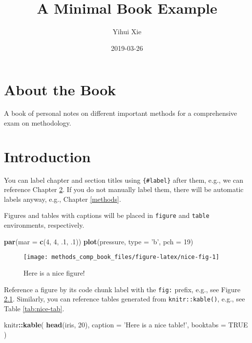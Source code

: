 \documentclass[]{book}
\title{A Minimal Book Example}
\author{Yihui Xie}
\date{2019-03-26}
\newenvironment{Shaded}{\begin{snugshade}}{\end{snugshade}}
\newcommand{\KeywordTok}[1]{\textcolor[rgb]{0.13,0.29,0.53}{\textbf{#1}}}
\newcommand{\DataTypeTok}[1]{\textcolor[rgb]{0.13,0.29,0.53}{#1}}
\newcommand{\DecValTok}[1]{\textcolor[rgb]{0.00,0.00,0.81}{#1}}
\newcommand{\StringTok}[1]{\textcolor[rgb]{0.31,0.60,0.02}{#1}}
\newcommand{\OtherTok}[1]{\textcolor[rgb]{0.56,0.35,0.01}{#1}}
\newcommand{\OperatorTok}[1]{\textcolor[rgb]{0.81,0.36,0.00}{\textbf{#1}}}
\newcommand{\NormalTok}[1]{#1}
\begin{document}
\maketitle

{
\setcounter{tocdepth}{1}
\tableofcontents
}
\chapter{About the Book}\label{about-the-book}

A book of personal notes on different important methods for a
comprehensive exam on methodology.

\chapter{Introduction}\label{intro}

You can label chapter and section titles using \texttt{\{\#label\}}
after them, e.g., we can reference Chapter \ref{intro}. If you do not
manually label them, there will be automatic labels anyway, e.g.,
Chapter \ref{methods}.

Figures and tables with captions will be placed in \texttt{figure} and
\texttt{table} environments, respectively.

\begin{Shaded}
\begin{Highlighting}[]
\KeywordTok{par}\NormalTok{(}\DataTypeTok{mar =} \KeywordTok{c}\NormalTok{(}\DecValTok{4}\NormalTok{, }\DecValTok{4}\NormalTok{, .}\DecValTok{1}\NormalTok{, .}\DecValTok{1}\NormalTok{))}
\KeywordTok{plot}\NormalTok{(pressure, }\DataTypeTok{type =} \StringTok{'b'}\NormalTok{, }\DataTypeTok{pch =} \DecValTok{19}\NormalTok{)}
\end{Highlighting}
\end{Shaded}

\begin{figure}

{\centering \texttt{[image: methods\_comp\_book\_files/figure-latex/nice-fig-1]} 

}

\caption{Here is a nice figure!}\label{fig:nice-fig}
\end{figure}

Reference a figure by its code chunk label with the \texttt{fig:}
prefix, e.g., see Figure \ref{fig:nice-fig}. Similarly, you can
reference tables generated from \texttt{knitr::kable()}, e.g., see Table
\ref{tab:nice-tab}.

\begin{Shaded}
\begin{Highlighting}[]
\NormalTok{knitr}\OperatorTok{::}\KeywordTok{kable}\NormalTok{(}
  \KeywordTok{head}\NormalTok{(iris, }\DecValTok{20}\NormalTok{), }\DataTypeTok{caption =} \StringTok{'Here is a nice table!'}\NormalTok{,}
  \DataTypeTok{booktabs =} \OtherTok{TRUE}
\NormalTok{)}
\end{Highlighting}
\end{Shaded}
\end{document}
